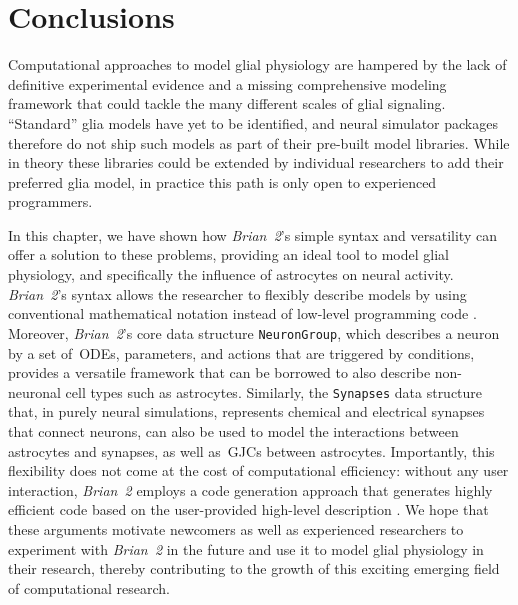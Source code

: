 \documentclass[a4paper, 11pt]{article}
\newcommand{\brian}{\emph{Brian~2}\xspace}
\begin{document}
\section*{Conclusions}
Computational approaches to model glial physiology are hampered by the lack of definitive experimental evidence and a missing comprehensive modeling framework that could tackle the many different scales of glial signaling.
``Standard'' glia models have yet to be identified, and neural simulator packages therefore do not ship such models as part of their pre-built model libraries.
While in theory these libraries could be extended by individual researchers to add their preferred glia model, in practice this path is only open to experienced programmers.

In this chapter, we have shown how \brian's simple syntax and versatility can offer a solution to these problems, providing an ideal tool to model glial physiology, and specifically the influence of astrocytes on neural activity.
\brian's syntax allows the researcher to flexibly describe models by using conventional mathematical notation instead of low-level programming code \citep{Goodman2008,Goodman2009,Stimberg2014}.
Moreover, \brian's core data structure \lstinline|NeuronGroup|, which describes a neuron by a set of~ODEs, parameters, and actions that are triggered by conditions, provides a versatile framework that can be borrowed to also describe non-neuronal cell types such as astrocytes.
Similarly, the \lstinline|Synapses| data structure that, in purely neural simulations, represents chemical and electrical synapses that connect neurons, can also be used to model the interactions between astrocytes and synapses, as well as~GJCs between astrocytes.
Importantly, this flexibility does not come at the cost of computational efficiency: without any user interaction, \brian employs a code generation approach that generates highly efficient code based on the user-provided high-level description \citep{Goodman2010}.
We hope that these arguments motivate newcomers as well as experienced researchers to experiment with \brian in the future and use it to model glial physiology in their research, thereby contributing to the growth of this exciting emerging field of computational research.
\end{document}
